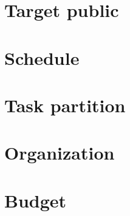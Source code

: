 \documentclass[a4paper,10pt]{article}
\begin{document}
\section{Target public}

\section{Schedule}

\section{Task partition}

\section{Organization}

\section{Budget}
\end{document}
